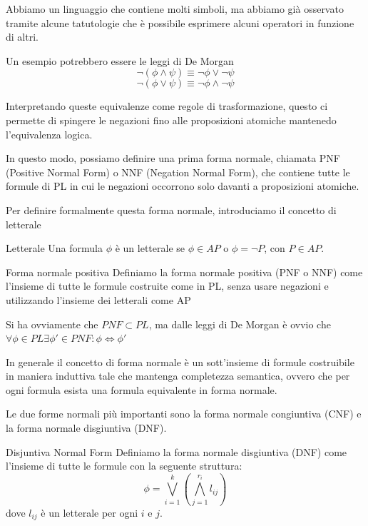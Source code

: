 Abbiamo un linguaggio che contiene molti simboli, ma abbiamo già osservato tramite alcune tatutologie che è possibile esprimere alcuni operatori in funzione di altri.

Un esempio potrebbero essere le leggi di De Morgan
\[\neg(\phi\land\psi) \equiv \neg\phi \lor \neg\psi\]
\[\neg(\phi\lor\psi) \equiv \neg\phi \land \neg\psi\]

Interpretando queste equivalenze come regole di trasformazione, questo ci permette di spingere le negazioni fino alle proposizioni atomiche mantenedo l'equivalenza logica.

In questo modo, possiamo definire una prima forma normale, chiamata PNF (Positive Normal Form) o NNF (Negation Normal Form), che contiene tutte le formule di PL in cui le negazioni occorrono solo davanti a proposizioni atomiche.

Per definire formalmente questa forma normale, introduciamo il concetto di letterale

\begin{definition}{Letterale}
  Una formula \(\phi\) è un letterale se \(\phi \in AP\) o \(\phi = \neg P \), con \(P \in AP\).
\end{definition}

\begin{definition}{Forma normale positiva}
  Definiamo la forma normale positiva (PNF o NNF) come l'insieme di tutte le formule costruite come in PL, senza usare negazioni e utilizzando l'insieme dei letterali come AP
\end{definition}

Si ha ovviamente che \(PNF \subset PL\), ma dalle leggi di De Morgan è ovvio che \(\forall \phi \in PL \exists \phi' \in PNF: \phi \iff \phi'\)

In generale il concetto di forma normale è un sott'insieme di formule costruibile in maniera induttiva tale che mantenga completezza semantica, ovvero che per ogni formula esista una formula equivalente in forma normale.

Le due forme normali più importanti sono la forma normale congiuntiva (CNF) e la forma normale disgiuntiva (DNF).

\begin{definition}{Disjuntiva Normal Form}
  Definiamo la forma normale disgiuntiva (DNF) come l'insieme di tutte le formule con la seguente struttura:
  \[\phi = \bigvee_{i=1}^k(\bigwedge_{j=1}^{r_i} l_{ij})\]
  dove \(l_{ij}\) è un letterale per ogni \(i\) e \(j\).
\end{definition}

